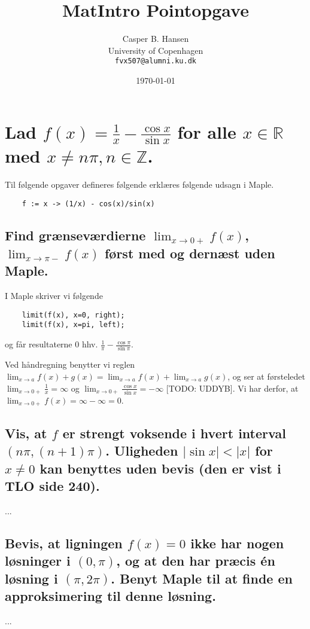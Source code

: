 \documentclass[11pt,a4paper]{article}
\title{MatIntro Pointopgave \assignmentnumber}
\author
{
    Casper B. Hansen\\
    University of Copenhagen\\
    {\tt fvx507@alumni.ku.dk}
}
\date{\today}
\newcommand{\modulus}[1]{\lvert#1\rvert}
\newcommand{\limit}[2]{\lim_{#1 \rightarrow #2}}
\begin{document}


\section
{
    \mdseries
    Lad $f(x) = \frac{1}{x} - \frac{\cos x}{\sin x}$ for alle $x \in
    \mathbb{R}$ med $x \neq n\pi, n \in \mathbb{Z}$.
}
Til følgende opgaver defineres følgende erklæres følgende udsagn i Maple.
\begin{lstlisting}
    f := x -> (1/x) - cos(x)/sin(x)
\end{lstlisting}

\subsection
{
    \mdseries
    Find grænseværdierne $\limit{x}{0+} f(x)$, $\limit{x}{\pi-} f(x)$ først
    med og dernæst uden Maple.
}
I Maple skriver vi følgende
\begin{lstlisting}
    limit(f(x), x=0, right);
    limit(f(x), x=pi, left);
\end{lstlisting}
og får resultaterne $0$ hhv. $\frac{1}{\pi} - \frac{\cos \pi}{\sin \pi}$.

Ved håndregning benytter vi reglen $\limit{x}{a} f(x) + g(x) = \limit{x}{a}
f(x) + \limit{x}{a} g(x)$, og ser at førsteledet $\limit{x}{0+} \frac{1}{x} =
\infty$ og $\limit{x}{0+} \frac{\cos x}{\sin x} = -\infty$ [TODO: UDDYB]. Vi
har derfor, at $\limit{x}{0+} f(x) = \infty - \infty = 0$.

\subsection
{
    \mdseries
    Vis, at $f$ er strengt voksende i hvert interval $(n\pi,(n+1)\pi)$.
    Uligheden $\modulus{\sin x} < \modulus{x}$ for $x \neq 0$ kan benyttes
    uden bevis (den er vist i TLO side 240).
}
...

\subsection
{
    \mdseries
    Bevis, at ligningen $f(x) = 0$ ikke har nogen løsninger i $(0, \pi)$, og
    at den har præcis én løsning i $(\pi,2\pi)$. Benyt Maple til at finde en
    approksimering til denne løsning.
}
...
\end{document}
